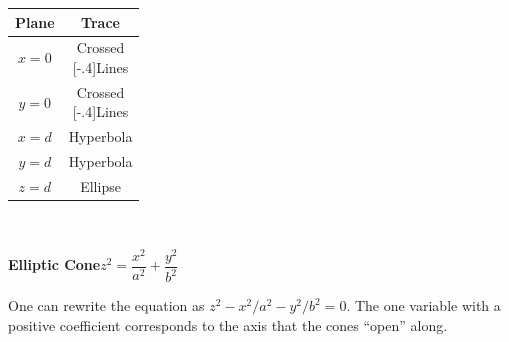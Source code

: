 \noindent
\begin{minipage}{\linewidth}
 \captionsetup{type=figure}%
 \noindent%
 \begin{minipage}[c]{.24\linewidth}
 \end{minipage}%
 \begin{minipage}[c]{.21\linewidth}
  \begin{tabular}{cc}
   \textbf{Plane}  & \textbf{Trace} \\\midrule
   $x=0$ & \parbox{5em}{\centering Crossed\\[-.4\baselineskip]Lines}\medskip\\
   $y=0$ & \parbox{5em}{\centering Crossed\\[-.4\baselineskip]Lines}\bigskip\\
   $x=d$ & Hyperbola\\
   $y=d$ & Hyperbola\\
   $z=d$ & Ellipse
  \end{tabular}
 \end{minipage}%
 \begin{minipage}[c]{.55\linewidth}
~%
 \end{minipage}
 \caption{\quad\textbf{Elliptic Cone}\qquad$z^2=\dfrac{x^2}{a^2}+\dfrac{y^2}{b^2}$}
 \label{fig_elliptic_cone}
 \bigskip
 \begin{minipage}{.75\linewidth}
  One can rewrite the equation as $z^2-x^2/a^2-y^2/{b^2} = 0$. The one variable with a positive coefficient corresponds to the axis that the cones ``open'' along. 
 \end{minipage}
\end{minipage}

\clearpage

